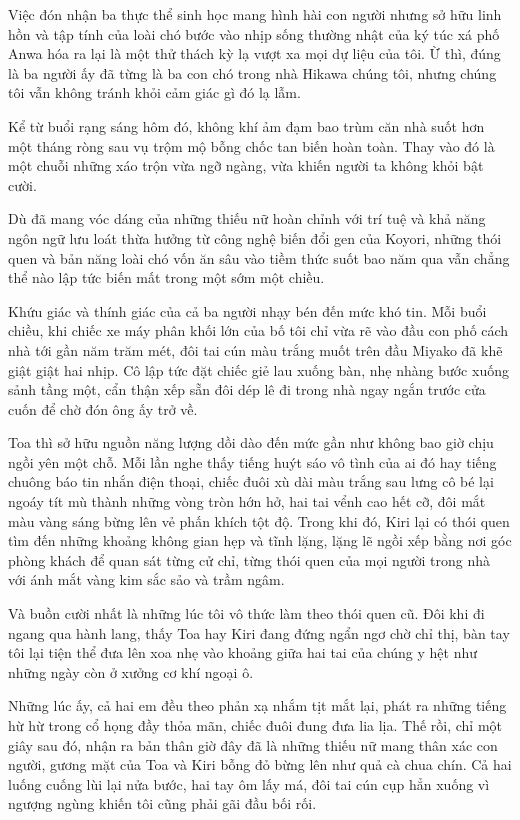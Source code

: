 \documentclass[../main.tex]{subfiles}
\begin{document}

Việc đón nhận ba thực thể sinh học mang hình hài con người nhưng sở hữu linh hồn và tập tính của loài chó bước vào nhịp sống thường nhật của ký túc xá phố Anwa hóa ra lại là một thử thách kỳ lạ vượt xa mọi dự liệu của tôi. Ừ thì, đúng là ba người ấy đã từng là ba con chó trong nhà Hikawa chúng tôi, nhưng chúng tôi vẫn không tránh khỏi cảm giác gì đó lạ lẫm.

Kể từ buổi rạng sáng hôm đó, không khí ảm đạm bao trùm căn nhà suốt hơn một tháng ròng sau vụ trộm mộ bỗng chốc tan biến hoàn toàn. Thay vào đó là một chuỗi những xáo trộn vừa ngỡ ngàng, vừa khiến người ta không khỏi bật cười.

Dù đã mang vóc dáng của những thiếu nữ hoàn chỉnh với trí tuệ và khả năng ngôn ngữ lưu loát thừa hưởng từ công nghệ biến đổi gen của Koyori, những thói quen và bản năng loài chó vốn ăn sâu vào tiềm thức suốt bao năm qua vẫn chẳng thể nào lập tức biến mất trong một sớm một chiều.

Khứu giác và thính giác của cả ba người nhạy bén đến mức khó tin. Mỗi buổi chiều, khi chiếc xe máy phân khối lớn của bố tôi chỉ vừa rẽ vào đầu con phố cách nhà tới gần năm trăm mét, đôi tai cún màu trắng muốt trên đầu Miyako đã khẽ giật giật hai nhịp. Cô lập tức đặt chiếc giẻ lau xuống bàn, nhẹ nhàng bước xuống sảnh tầng một, cẩn thận xếp sẵn đôi dép lê đi trong nhà ngay ngắn trước cửa cuốn để chờ đón ông ấy trở về.

Toa thì sở hữu nguồn năng lượng dồi dào đến mức gần như không bao giờ chịu ngồi yên một chỗ. Mỗi lần nghe thấy tiếng huýt sáo vô tình của ai đó hay tiếng chuông báo tin nhắn điện thoại, chiếc đuôi xù dài màu trắng sau lưng cô bé lại ngoáy tít mù thành những vòng tròn hớn hở, hai tai vểnh cao hết cỡ, đôi mắt màu vàng sáng bừng lên vẻ phấn khích tột độ. Trong khi đó, Kiri lại có thói quen tìm đến những khoảng không gian hẹp và tĩnh lặng, lặng lẽ ngồi xếp bằng nơi góc phòng khách để quan sát từng cử chỉ, từng thói quen của mọi người trong nhà với ánh mắt vàng kim sắc sảo và trầm ngâm.

Và buồn cười nhất là những lúc tôi vô thức làm theo thói quen cũ. Đôi khi đi ngang qua hành lang, thấy Toa hay Kiri đang đứng ngẩn ngơ chờ chỉ thị, bàn tay tôi lại tiện thể đưa lên xoa nhẹ vào khoảng giữa hai tai của chúng y hệt như những ngày còn ở xưởng cơ khí ngoại ô.

Những lúc ấy, cả hai em đều theo phản xạ nhắm tịt mắt lại, phát ra những tiếng hừ hừ trong cổ họng đầy thỏa mãn, chiếc đuôi đung đưa lia lịa. Thế rồi, chỉ một giây sau đó, nhận ra bản thân giờ đây đã là những thiếu nữ mang thân xác con người, gương mặt của Toa và Kiri bỗng đỏ bừng lên như quả cà chua chín. Cả hai luống cuống lùi lại nửa bước, hai tay ôm lấy má, đôi tai cún cụp hẳn xuống vì ngượng ngùng khiến tôi cũng phải gãi đầu bối rối.
\end{document}

